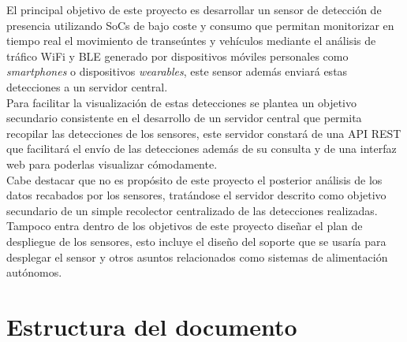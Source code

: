 \documentclass[../proyecto.tex]{subfiles}
\begin{document}
El principal objetivo de este proyecto es desarrollar un sensor de detección de presencia utilizando SoCs de bajo coste y consumo que permitan monitorizar en tiempo real el movimiento de transeúntes y vehículos mediante el análisis de tráfico WiFi y BLE generado por dispositivos móviles personales como \textit{smartphones} o dispositivos \textit{wearables}, este sensor además enviará estas detecciones a un servidor central.\\

Para facilitar la visualización de estas detecciones se plantea un objetivo secundario consistente en el desarrollo de un servidor central que permita recopilar las detecciones de los sensores, este servidor constará de una API REST que facilitará el envío de las detecciones además de su consulta y de una interfaz web para poderlas visualizar cómodamente.\\

Cabe destacar que no es propósito de este proyecto el posterior análisis de los datos recabados por los sensores, tratándose el servidor descrito como objetivo secundario de un simple recolector centralizado de las detecciones realizadas. Tampoco entra dentro de los objetivos de este proyecto diseñar el plan de despliegue de los sensores, esto incluye el diseño del soporte que se usaría para desplegar el sensor y otros asuntos relacionados como sistemas de alimentación autónomos.\\

\section{Estructura del documento}
\end{document}
